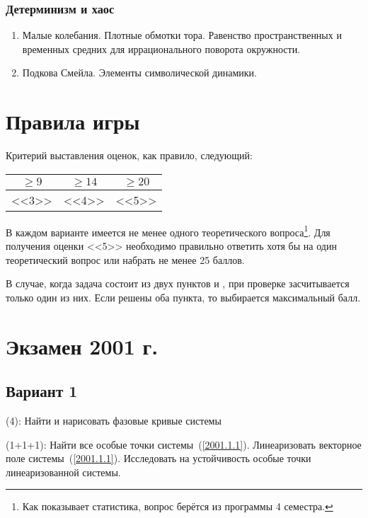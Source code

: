 \documentclass[a4paper]{article}
\newcommand{\skill}[1]{\textsf{(#1):}}
\begin{document}
\subsubsection{Детерминизм и хаос}
\begin{enumerate}
\setlength\itemsep{-1.5mm}
\item Малые колебания. Плотные обмотки тора. Равенство пространственных и временных средних для
иррационального поворота окружности.
\item Подкова Смейла. Элементы символической динамики.
\end{enumerate}

\section{Правила игры}

Критерий выставления оценок, как правило, следующий:
\begin{center}
\begin{tabular}{|c|c|c|}
\hline $\ge 9$ & $\ge 14$ & $\ge 20$\\
\hline <<3>>   & <<4>>    & <<5>>\\
\hline
\end{tabular}
\end{center}
В каждом варианте имеется не менее одного теоретического вопроса\footnote{Как показывает
статистика, вопрос берётся из программы 4 семестра.}. Для
получения оценки <<5>> необходимо правильно ответить хотя бы на один теоретический вопрос
или набрать не менее 25 баллов.

В случае, когда задача состоит из двух пунктов  и , при проверке засчитывается только
один из них. Если решены оба пункта, то выбирается максимальный балл.

\section{Экзамен 2001 г.}

\subsection{Вариант 1}

\begin{problem}
\skill{4}
Найти и нарисовать фазовые кривые  системы
\end{problem}

\begin{problem}
\skill{1+1+1}
Найти все особые точки системы~(\ref{2001.1.1}). Линеаризовать векторное поле системы~(\ref{2001.1.1}).
Исследовать на устойчивость особые точки линеаризованной системы.
\end{problem}
\end{document}
